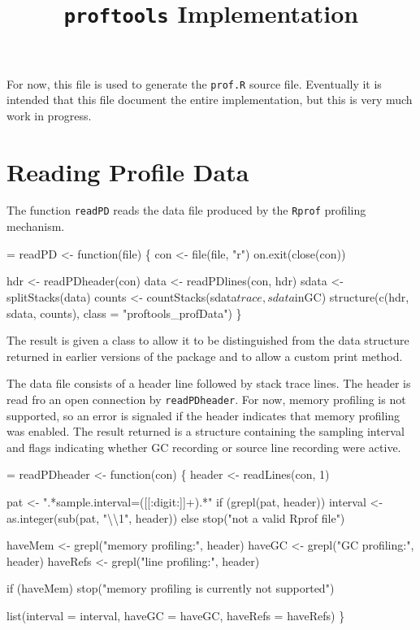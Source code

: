 \documentclass[11pt]{article}
\title{\texttt{proftools} Implementation}
\begin{document}
\maketitle

For now, this file is used to generate the \Verb!prof.R! source
file. Eventually it is intended that this file document the entire
implementation, but this is very much work in progress.

\section{Reading Profile Data}
The function \Verb!readPD! reads the data file produced by the \Verb?Rprof?
profiling mechanism.
\begin{nwchunk}
=
 readPD <- function(file) \{
     con <- file(file, "r")
     on.exit(close(con))
     
     hdr <- readPDheader(con)
     data <- readPDlines(con, hdr)
     sdata <- splitStacks(data)
     counts <- countStacks(sdata$trace, sdata$inGC)
     structure(c(hdr, sdata, counts), class =  "proftools_profData")
 \}
\end{nwchunk}
The result is given a class to allow it to be distinguished from the
data structure returned in earlier versions of the package and to
allow a custom print method.

The data file consists of a header line followed by stack trace
lines. The header is read fro an open connection by \Verb!readPDheader!.
For now, memory profiling is not supported, so an error is signaled if
the header indicates that memory profiling was enabled. The result
returned is a structure containing the sampling interval and flags
indicating whether GC recording or source line recording were active.
\begin{nwchunk}
=
 readPDheader <- function(con) \{
     header <- readLines(con, 1)
 
     pat <- ".*sample.interval=([[:digit:]]+).*"
     if (grepl(pat, header))
         interval <- as.integer(sub(pat, "{\textbackslash}{\textbackslash}1", header))
     else
         stop("not a valid Rprof file")
 
     haveMem <- grepl("memory profiling:", header)
     haveGC <- grepl("GC profiling:", header)
     haveRefs <- grepl("line profiling:", header)
 
     if (haveMem)
         stop("memory profiling is currently not supported")
 
     list(interval = interval, haveGC = haveGC, haveRefs = haveRefs)
 \}
\end{nwchunk}
\end{document}

